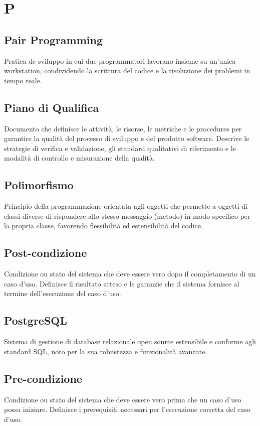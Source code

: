 \documentclass[a4paper,11pt]{article}
\begin{document}
\newpage
\section{P}

\subsection{Pair Programming}
Pratica de sviluppo in cui due programmatori lavorano insieme su un'unica workstation, condividendo la scrittura del codice e la risoluzione dei problemi in tempo reale.

\subsection{Piano di Qualifica}
Documento che definisce le attività, le risorse, le metriche e le procedures per garantire la qualità del processo di sviluppo e del prodotto software. Descrive le strategie di verifica e validazione, gli standard qualitativi di riferimento e le modalità di controllo e misurazione della qualità.

\subsection{Polimorfismo}
Principio della programmazione orientata agli oggetti che permette a oggetti di classi diverse di rispondere allo stesso messaggio (metodo) in modo specifico per la propria classe, favorendo flessibilità ed estensibilità del codice.

\subsection{Post-condizione}
Condizione ou stato del sistema che deve essere vero dopo il completamento di un caso d'uso. Definisce il risultato atteso e le garanzie che il sistema fornisce al termine dell'esecuzione del caso d'uso.

\subsection{PostgreSQL}
Sistema di gestione di database relazionale open source estensibile e conforme agli standard SQL, noto per la sua robustezza e funzionalità avanzate.

\subsection{Pre-condizione}
Condizione ou stato del sistema che deve essere vero prima che un caso d'uso possa iniziare. Definisce i prerequisiti necessari per l'esecuzione corretta del caso d'uso.
\end{document}
